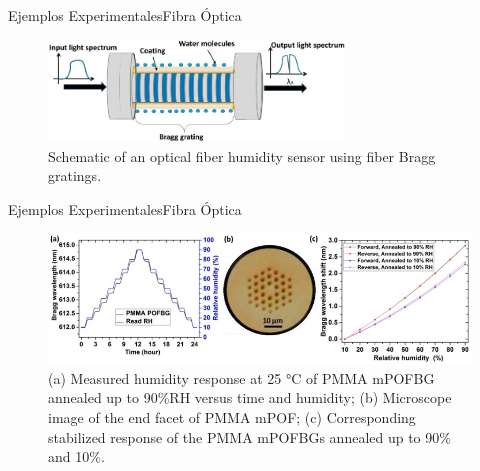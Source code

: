 \documentclass[]{beamer}
\begin{document}
\begin{frame}{Ejemplos Experimentales}{Fibra Óptica}
  \begin{figure}
    \includegraphics[width=0.7\textwidth]{Docs/exp3}
    \caption{Schematic of an optical fiber humidity sensor using fiber Bragg gratings.}
    \label{}
  \end{figure}

\end{frame}

\begin{frame}{Ejemplos Experimentales}{Fibra Óptica}
  \begin{figure}
    \includegraphics[width=\textwidth]{Docs/exp4}
    \caption{(a) Measured humidity response at 25 °C of PMMA mPOFBG annealed up to 90\%RH versus time and humidity; (b) Microscope image of the end facet of PMMA mPOF; (c) Corresponding stabilized response of the PMMA mPOFBGs annealed up to 90\% and 10\%.}
    \label{}
  \end{figure}

\end{frame}
\end{document}
